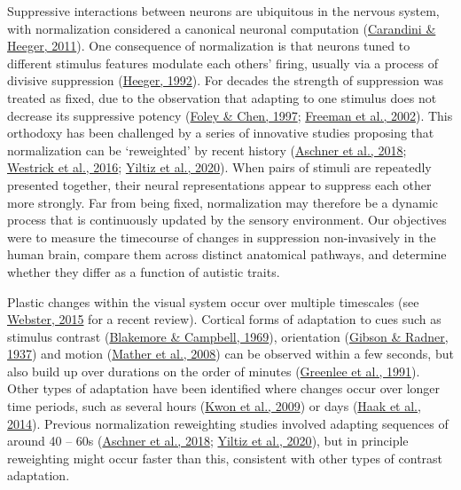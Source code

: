 \documentclass[
]{article}
\begin{document}
Suppressive interactions between neurons are ubiquitous in the nervous system, with normalization considered a canonical neuronal computation (\protect\hyperlink{ref-Carandini2011}{Carandini \& Heeger, 2011}). One consequence of normalization is that neurons tuned to different stimulus features modulate each others' firing, usually via a process of divisive suppression (\protect\hyperlink{ref-Heeger1992}{Heeger, 1992}). For decades the strength of suppression was treated as fixed, due to the observation that adapting to one stimulus does not decrease its suppressive potency (\protect\hyperlink{ref-Foley1997}{Foley \& Chen, 1997}; \protect\hyperlink{ref-Freeman2002}{Freeman et al., 2002}). This orthodoxy has been challenged by a series of innovative studies proposing that normalization can be `reweighted' by recent history (\protect\hyperlink{ref-Aschner2018}{Aschner et al., 2018}; \protect\hyperlink{ref-Westrick2016}{Westrick et al., 2016}; \protect\hyperlink{ref-Yiltiz2020}{Yiltiz et al., 2020}). When pairs of stimuli are repeatedly presented together, their neural representations appear to suppress each other more strongly. Far from being fixed, normalization may therefore be a dynamic process that is continuously updated by the sensory environment. Our objectives were to measure the timecourse of changes in suppression non-invasively in the human brain, compare them across distinct anatomical pathways, and determine whether they differ as a function of autistic traits.

Plastic changes within the visual system occur over multiple timescales (see \protect\hyperlink{ref-Webster2015}{Webster, 2015} for a recent review). Cortical forms of adaptation to cues such as stimulus contrast (\protect\hyperlink{ref-Blakemore1969}{Blakemore \& Campbell, 1969}), orientation (\protect\hyperlink{ref-Gibson1937}{Gibson \& Radner, 1937}) and motion (\protect\hyperlink{ref-Mather2008}{Mather et al., 2008}) can be observed within a few seconds, but also build up over durations on the order of minutes (\protect\hyperlink{ref-Greenlee1991}{Greenlee et al., 1991}). Other types of adaptation have been identified where changes occur over longer time periods, such as several hours (\protect\hyperlink{ref-Kwon2009}{Kwon et al., 2009}) or days (\protect\hyperlink{ref-Haak2014}{Haak et al., 2014}). Previous normalization reweighting studies involved adapting sequences of around 40 -- 60s (\protect\hyperlink{ref-Aschner2018}{Aschner et al., 2018}; \protect\hyperlink{ref-Yiltiz2020}{Yiltiz et al., 2020}), but in principle reweighting might occur faster than this, consistent with other types of contrast adaptation.
\end{document}
